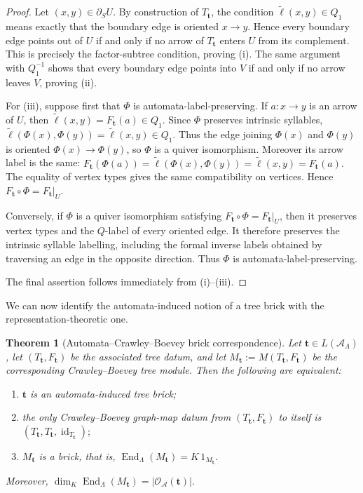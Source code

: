 \documentclass[11pt,a4paper]{amsart}
\theoremstyle{definition}
\theoremstyle{plain}
\newtheorem{theorem}[definition]{Theorem}
\theoremstyle{remark}
\numberwithin{equation}{section}
\begin{document}
\begin{proof}
Let $(x,y)\in\partial_SU$. By construction of $T_{\mathbf t}$, the condition $\widetilde{\ell}(x,y)\in Q_1$ means exactly that the boundary edge is oriented $x\to y$. Hence every boundary edge points out of $U$ if and only if no arrow of $T_{\mathbf t}$ enters $U$ from its complement. This is precisely the factor-subtree condition, proving \textup{(i)}. The same argument with $Q_1^{-1}$ shows that every boundary edge points into $V$ if and only if no arrow leaves $V$, proving \textup{(ii)}.

For \textup{(iii)}, suppose first that $\Phi$ is automata-label-preserving. If $a:x\to y$ is an arrow of $U$, then
$
\widetilde{\ell}(x,y)=F_{\mathbf t}(a)\in Q_1.
$
Since $\Phi$ preserves intrinsic syllables,
$
\widetilde{\ell}(\Phi(x),\Phi(y))
=
\widetilde{\ell}(x,y)\in Q_1.
$
Thus the edge joining $\Phi(x)$ and $\Phi(y)$ is oriented $\Phi(x)\to\Phi(y)$, so $\Phi$ is a quiver isomorphism. Moreover its arrow label is the same:
$
F_{\mathbf t}(\Phi(a))
=
\widetilde{\ell}(\Phi(x),\Phi(y))
=
\widetilde{\ell}(x,y)
=
F_{\mathbf t}(a).
$
The equality of vertex types gives the same compatibility on vertices. Hence $F_{\mathbf t}\circ\Phi=F_{\mathbf t}|_U$.

Conversely, if $\Phi$ is a quiver isomorphism satisfying $F_{\mathbf t}\circ\Phi=F_{\mathbf t}|_U$, then it preserves vertex types and the $Q$-label of every oriented edge. It therefore preserves the intrinsic syllable labelling, including the formal inverse labels obtained by traversing an edge in the opposite direction. Thus $\Phi$ is automata-label-preserving.

The final assertion follows immediately from \textup{(i)}--\textup{(iii)}.
\end{proof}

We can now identify the automata-induced notion of a tree brick with the representation-theoretic one.

\begin{theorem}[Automata--Crawley--Boevey brick correspondence]\label{thm:brick-criterion}
Let $\mathbf t\in L(\mathcal A_\Lambda)$, let $(T_{\mathbf t},F_{\mathbf t})$ be the associated tree datum, and let
$
M_{\mathbf t}:=M(T_{\mathbf t},F_{\mathbf t})
$
be the corresponding Crawley--Boevey tree module. Then the following are equivalent:
\begin{enumerate}[label=\textup{(\roman*)}]
\item $\mathbf t$ is an automata-induced tree brick;
\item the only Crawley--Boevey graph-map datum from $(T_{\mathbf t},F_{\mathbf t})$ to itself is
$
(T_{\mathbf t},T_{\mathbf t},\operatorname{id}_{T_{\mathbf t}});
$
\item $M_{\mathbf t}$ is a brick, that is,
$
\operatorname{End}_{\Lambda}(M_{\mathbf t})=K\,1_{M_{\mathbf t}}.
$
\end{enumerate}
Moreover,
$
\dim_K\operatorname{End}_{\Lambda}(M_{\mathbf t})
=
|\mathscr O_{\mathcal A}(\mathbf t)|.
$
\end{theorem}
\end{document}
